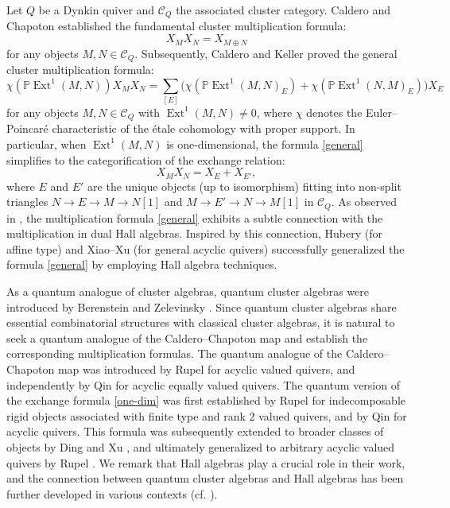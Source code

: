 \documentclass[reqno,12pt]{amsart}
\numberwithin{equation}{section}
\theoremstyle{plain} %
\theoremstyle{definition} %
\begin{document}
Let $Q$ be a Dynkin quiver and $\mathcal{C}_Q$ the associated cluster category. Caldero and Chapoton \cite{CC} established the fundamental cluster multiplication formula:
\begin{equation}\label{jiben}
	X_M X_N = X_{M\oplus N}
\end{equation}
for any objects $M, N \in \mathcal{C}_Q$. Subsequently, Caldero and Keller \cite{CK2005} proved the general cluster multiplication formula:
\begin{equation}\label{general}
	\chi (\mathbb{P} \operatorname{Ext}^1(M,N)) X_M X_N = \sum_{[E]} \Big( \chi (\mathbb{P} \operatorname{Ext}^1(M,N)_E) + \chi (\mathbb{P} \operatorname{Ext}^1(N,M)_E) \Big) X_E
\end{equation}
for any objects $M, N \in \mathcal{C}_Q$ with $\operatorname{Ext}^1(M,N) \neq 0$, where $\chi$ denotes the Euler--Poincar\'e characteristic of the \'etale cohomology with proper support. In particular, when $\operatorname{Ext}^1(M,N)$ is one-dimensional, the formula \eqref{general} simplifies to the categorification of the exchange relation:
\begin{equation}\label{one-dim}
	X_M X_N = X_E + X_{E'},
\end{equation}
where $E$ and $E'$ are the unique objects (up to isomorphism) fitting into non-split triangles $N \rightarrow E \rightarrow M \rightarrow N[1]$ and $M \rightarrow E' \rightarrow N \rightarrow M[1]$ in $\mathcal{C}_Q$. As observed in \cite{CK2005}, the multiplication formula \eqref{general} exhibits a subtle connection with the multiplication in dual Hall algebras. Inspired by this connection, Hubery \cite{Hubery1} (for affine type) and Xiao--Xu \cite{XX, Xu} (for general acyclic quivers) successfully generalized the formula \eqref{general} by employing Hall algebra techniques.

As a quantum analogue of cluster algebras, quantum cluster algebras were introduced by Berenstein and Zelevinsky \cite{BZ05}. Since quantum cluster algebras share essential combinatorial structures with classical cluster algebras, it is natural to seek a quantum analogue of the Caldero--Chapoton map and establish the corresponding multiplication formulas.
The quantum analogue of the Caldero--Chapoton map was introduced by Rupel \cite{Rupel1} for acyclic valued quivers, and independently by Qin \cite{Qin} for acyclic equally valued quivers. The quantum version of the exchange formula \eqref{one-dim} was first established by Rupel \cite{Rupel1} for indecomposable rigid objects associated with finite type and rank 2 valued quivers, and by Qin \cite{Qin} for acyclic quivers. This formula was subsequently extended to broader classes of objects by Ding and Xu \cite{DX}, and ultimately generalized to arbitrary acyclic valued quivers by Rupel \cite{Rupel2}. We remark that Hall algebras play a crucial role in their work, and the connection between quantum cluster algebras and Hall algebras has been further developed in various contexts (cf. \cite{BR, CDX,Con, DSC, DX, Fei, FPZ}).
\end{document}
